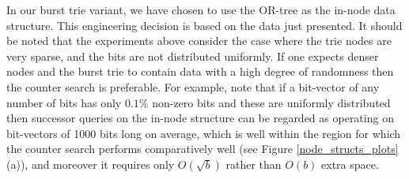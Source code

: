 \documentclass[]{acmtrans2m}
\newcommand{\comment}[1]{}
\begin{document}
\comment{
A compromise between the instruction counts, branch prediction characteristics and data cache misses of the counter
search and the OR-tree can be obtained by dividing the bit vector into chunks of size $B$. Counter searches are used
in these chunks, and an OR-tree with $b/B$ leaves is formed over the chunks. 
As expected, the hybrid searching technique has an instruction count, cache miss rate and branch misprediction rate between that of the 
counter search and the OR-tree. However, as Figure \ref{node_structs_plots}(a) shows, this trade-off in constant factors does not result
}

In our burst trie variant, we have chosen to use the OR-tree as the in-node data structure. This engineering decision
is based on the data just presented. It should be noted that the experiments above consider the case where the trie nodes are
very sparse, and the bits are not distributed uniformly. If one expects denser nodes and the burst trie to contain data with a high degree of randomness 
then the counter search is preferable. For example, note that if a bit-vector of any number of bits has only $0.1\%$ non-zero bits and these are uniformly distributed then successor queries 
on the in-node structure can be regarded as operating on bit-vectors of 1000 bits long on average, which is well within the region for which the
counter search performs comparatively well (see Figure \ref{node_structs_plots}(a)), and moreover it requires only $O(\sqrt{b})$ rather than $O(b)$ extra space. 
\end{document}
